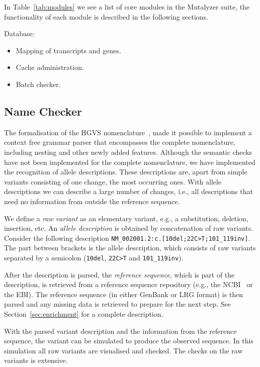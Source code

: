 \documentclass{article}
\begin{document}
In Table~\ref{tab:modules} we see a list of core modules in the Mutalyzer
suite, the functionality of each module is described in the following sections.

Database:
\begin{itemize}
  \item Mapping of transcripts and genes.
  \item Cache administration.
  \item Batch checker.
\end{itemize}


\subsection{Name Checker} \label{subsec:namecheck}
The formalisation of the HGVS nomenclature~\cite{hgvs_bnf}, made it possible to
implement a context free grammar parser that encompasses the complete
nomenclature, including nesting and other newly added features. Although the
semantic checks have not been implemented for the complete nomenclature, we
have implemented the recognition of allele descriptions. These descriptions
are, apart from simple variants consisting of one change, the most occurring
ones. With allele descriptions we can describe a large number of changes, i.e.,
all descriptions that need no information from outside the reference sequence.

We define a \emph{raw variant} as an elementary variant, e.g., a substitution,
deletion, insertion, etc. An \emph{allele description} is obtained by
concatenation of raw variants. Consider the following description
\texttt{NM\_002001.2:c.[10del;22C>T;101\_119inv]}. The part between brackets is
the allele description, which consists of raw variants separated by a semicolon
(\texttt{10del}, \texttt{22C>T} and \texttt{101\_119inv}).

After the description is parsed, the \emph{reference sequence}, which is part
of the description, is retrieved from a reference sequence repository (e.g.,
the NCBI~\cite{NCBI} or the EBI). The reference sequence (in either GenBank or
LRG format) is then parsed and any missing data is retrieved to prepare for the
next step. See Section~\ref{sec:enrichment} for a complete description.

With the parsed variant description and the information from the reference sequence, the variant can be simulated to produce the observed
sequence. In this simulation all raw variants are visualised and checked. The
checks on the raw variants is extensive.
\end{document}

